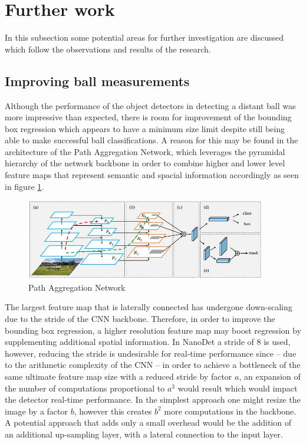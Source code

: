 \documentclass[a4paper,twoside,12pt]{report}
\begin{document}
\section{Further work}

In this subsection some potential areas for further investigation are discussed which follow the observations and results of the research. 

\subsection{Improving ball measurements}

Although the performance of the object detectors in detecting a distant ball was more impressive than expected, there is room for improvement of the bounding box regression which appears to have a minimum size limit despite still being able to make successful ball classifications. A reason for this may be found in the architecture of the Path Aggregation Network, which leverages the pyramidal hierarchy of the network backbone in order to combine higher and lower level feature maps that represent semantic and spacial information accordingly as seen in figure \ref{fig:pan}. 

\begin{figure}[h!]
\begin{center}
\includegraphics[width=10.5cm]{images/pan.jpg}
\caption{Path Aggregation Network \citep{pan}}
\label{fig:pan}
\end{center}
\end{figure}

The largest feature map that is laterally connected has undergone down-scaling due to the stride of the CNN backbone. Therefore, in order to improve the bounding box regression, a higher resolution feature map may boost regression by supplementing additional spatial information. In NanoDet a stride of 8 is used, however, reducing the stride is undesirable for real-time performance since -- due to the arithmetic complexity of the CNN -- in order to achieve a bottleneck of the same ultimate feature map size with a reduced stride by factor $a$, an expansion of the number of computations proportional to $a^3$ would result which would impact the detector real-time performance. In the simplest approach one might resize the image by a factor $b$, however this creates $b^2$ more computations in the backbone. A potential approach that adds only a small overhead would be the addition of an additional up-sampling layer, with a lateral connection to the input layer.
\end{document}
